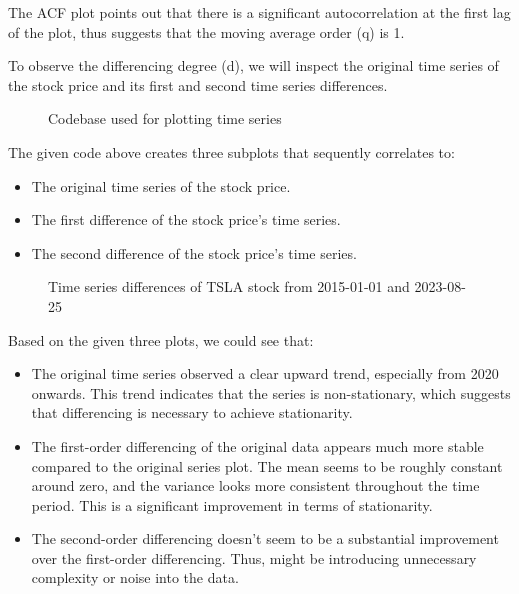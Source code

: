 \documentclass[11pt]{article}
\begin{document}
The ACF plot points out that there is a significant autocorrelation at the first lag of the plot, thus suggests that the moving average order (q) is 1.

To observe the differencing degree (d), we will inspect the original time series of the stock price and its first and second time series differences.

\begin{figure}[ht]
    \centering
    \caption{Codebase used for plotting time series}
    \label{fig:time_series_code}
\end{figure}

The given code above creates three subplots that sequently correlates to:
\begin{itemize}
    \item The original time series of the stock price.
    \item The first difference of the stock price's time series.
    \item The second difference of the stock price's time series.
\end{itemize}

\begin{figure}[ht]
    \centering
    \caption{Time series differences of TSLA stock from 2015-01-01 and 2023-08-25}
    \label{fig:time_series_diff}
\end{figure}

Based on the given three plots, we could see that:
\begin{itemize}
    \item The original time series observed a clear upward trend, especially from 2020 onwards. This trend indicates that the series is non-stationary, which suggests that differencing is necessary to achieve stationarity.
    \item The first-order differencing of the original data appears much more stable compared to the original series plot. The mean seems to be roughly constant around zero, and the variance looks more consistent throughout the time period. This is a significant improvement in terms of stationarity.
    \item The second-order differencing doesn't seem to be a substantial improvement over the first-order differencing. Thus, might be introducing unnecessary complexity or noise into the data.
\end{itemize}
\end{document}
